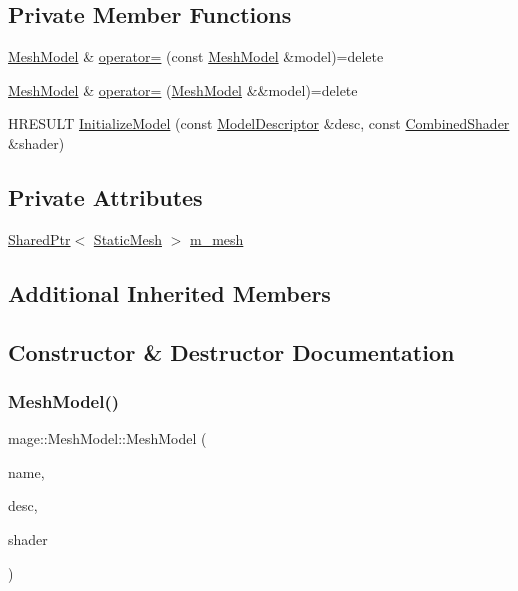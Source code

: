 \subsection*{Private Member Functions}
\begin{DoxyCompactItemize}
\item 
\hyperlink{classmage_1_1_mesh_model}{Mesh\+Model} \& \hyperlink{classmage_1_1_mesh_model_a0cffe92f76d2470c67ae71a5a4046259}{operator=} (const \hyperlink{classmage_1_1_mesh_model}{Mesh\+Model} \&model)=delete
\item 
\hyperlink{classmage_1_1_mesh_model}{Mesh\+Model} \& \hyperlink{classmage_1_1_mesh_model_ab01cee26691745ec7cd1af933bb5fa99}{operator=} (\hyperlink{classmage_1_1_mesh_model}{Mesh\+Model} \&\&model)=delete
\item 
H\+R\+E\+S\+U\+LT \hyperlink{classmage_1_1_mesh_model_a9971552f5c866b8ed221df056c46a42d}{Initialize\+Model} (const \hyperlink{classmage_1_1_model_descriptor}{Model\+Descriptor} \&desc, const \hyperlink{structmage_1_1_combined_shader}{Combined\+Shader} \&shader)
\end{DoxyCompactItemize}
\subsection*{Private Attributes}
\begin{DoxyCompactItemize}
\item 
\hyperlink{namespacemage_a1e01ae66713838a7a67d30e44c67703e}{Shared\+Ptr}$<$ \hyperlink{classmage_1_1_static_mesh}{Static\+Mesh} $>$ \hyperlink{classmage_1_1_mesh_model_a938e3a83fa927b2427212bd2e397aa87}{m\+\_\+mesh}
\end{DoxyCompactItemize}
\subsection*{Additional Inherited Members}


\subsection{Constructor \& Destructor Documentation}
\hypertarget{classmage_1_1_mesh_model_a95d70993b56b1a649797880583daf3db}{}\label{classmage_1_1_mesh_model_a95d70993b56b1a649797880583daf3db} 
\subsubsection{\texorpdfstring{Mesh\+Model()}{MeshModel()}\hspace{0.1cm}{\footnotesize\ttfamily [1/3]}}
{\footnotesize\ttfamily mage\+::\+Mesh\+Model\+::\+Mesh\+Model (\begin{DoxyParamCaption}\item[{const string \&}]{name,  }\item[{const \hyperlink{classmage_1_1_model_descriptor}{Model\+Descriptor} \&}]{desc,  }\item[{const \hyperlink{structmage_1_1_combined_shader}{Combined\+Shader} \&}]{shader }\end{DoxyParamCaption})}

